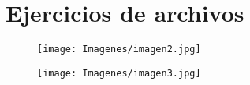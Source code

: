 \section{Ejercicios de archivos}
\begin{figure}[h]
    \centering
    \texttt{[image: Imagenes/imagen2.jpg]}
\end{figure}

\begin{figure}[h]
    \centering
    \texttt{[image: Imagenes/imagen3.jpg]}
\end{figure}